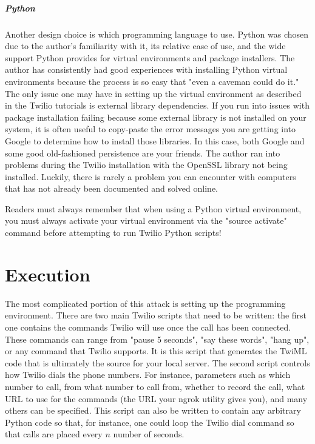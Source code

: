 \documentclass[10pt]{report}
\begin{document}
\paragraph{Python}
Another design choice is which programming language to use. Python was chosen due to the author's familiarity with it, its relative ease of use, and the wide support Python provides for virtual environments and package installers. The author has consistently had good experiences with installing Python virtual environments because the process is so easy that "even a caveman could do it." The only issue one may have in setting up the virtual environment as described in the Twilio tutorials is external library dependencies. If you run into issues with package installation failing because some external library is not installed on your system, it is often useful to copy-paste the error messages you are getting into Google to determine how to install those libraries. In this case, both Google and some good old-fashioned persistence are your friends. The author ran into problems during the Twilio installation with the OpenSSL library not being installed. Luckily, there is rarely a problem you can encounter with computers that has not already been documented and solved online.

Readers must always remember that when using a Python virtual environment, you must always activate your virtual environment via the "source activate" command before attempting to run Twilio Python scripts!

\chapter{Execution}

The most complicated portion of this attack is setting up the programming environment. There are two main Twilio scripts that need to be written: the first one contains the commands Twilio will use once the call has been connected. These commands can range from "pause 5 seconds", "say these words", "hang up", or any command that Twilio supports. It is this script that generates the TwiML code that is ultimately the source for your local server. The second script controls how Twilio dials the phone numbers. For instance, parameters such as which number to call, from what number to call from, whether to record the call, what URL to use for the commands (the URL your ngrok utility gives you), and many others can be specified. This script can also be written to contain any arbitrary Python code so that, for instance, one could loop the Twilio dial command so that calls are placed every $n$ number of seconds.
\end{document}

